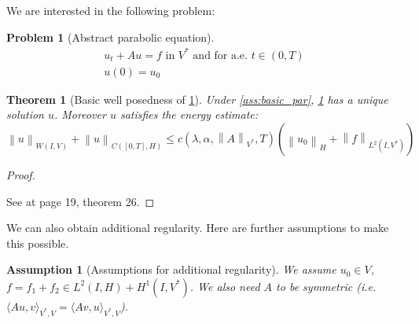 \documentclass[english,a4paper,10pt,oneside]{scrbook}	%
\theoremstyle{break}
\newtheorem{thm}[equation]{Theorem}
\newtheorem{ass}[equation]{Assumption}
\newtheorem{pb}[equation]{Problem}
\newenvironment{mproof}[1][\proofname]{%
  \begin{proof}[#1]$ $\par\nobreak\ignorespaces
}{%
  \end{proof}
}
\renewcommand*{\proofname}{Proof}
\theoremstyle{remark}
\newcommand{\norm}[1]{\left\lVert#1\right\rVert}
\newcommand{\HN}[1]{\norm{#1}_{H}}
\newcommand{\VSN}[1]{\norm{#1}_{V^*}}
\begin{document}
We are interested in the following problem:

\begin{pb}[Abstract parabolic equation]
\label{eqn:general_parabolic}
\begin{align}
	u_t+Au=f \text{ in }V^* \text{ and for a.e. } t \in (0,T)\\
	u(0)=u_0
\end{align}
\end{pb}

\begin{thm}[Basic well posedness of \cref{eqn:general_parabolic}]
\label{thm:well_pos_parabolic}
Under \cref{ass:basic_par}, \cref{eqn:general_parabolic} has a unique solution $u$. Moreover $u$ satisfies the energy estimate:
\begin{equation}
	\label{eqn:en_est}
	\norm{u}_{W(I,V)} + \norm{u}_{C([0,T],H)}\leq c(\lambda, \alpha, \VSN{A}, T)(\HN{u_0}+\norm{f}_{L^2(I,V^*)})
\end{equation} 
\end{thm}
\begin{mproof}
See \cite{gilardi} at page 19, theorem 26.
\end{mproof}

We can also obtain additional regularity. Here are further assumptions to make this possible.

\begin{ass}[Assumptions for additional regularity]
\label{ass:reg_par}
We assume $u_0 \in V$, $f = f_1+f_2 \in L^2(I,H)+H^1(I,V^*)$. We also need $A$ to be symmetric (i.e. $\langle Au,v \rangle_{V^*,V} = \langle Av,u \rangle_{V^*,V}$).
\end{ass}
\end{document}
